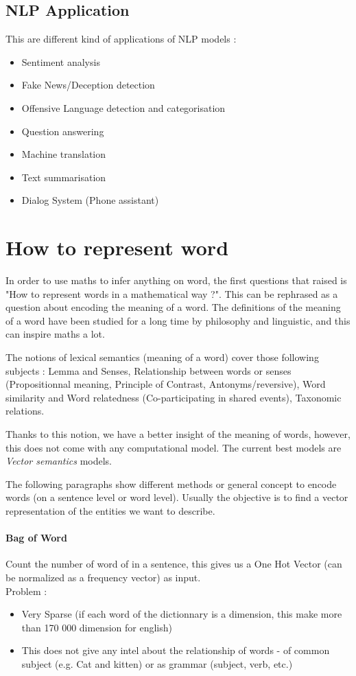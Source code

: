 			\subsection{NLP Application}
				This are different kind of applications of NLP models :
				\begin{itemize}
					\item Sentiment analysis
					\item Fake News/Deception detection
					\item Offensive Language detection and categorisation
					\item Question answering
					\item Machine translation
					\item Text summarisation
					\item Dialog System (Phone assistant)
				\end{itemize}

	\section{How to represent word}

		In order to use maths to infer anything on word, the first questions that raised is "How to represent words in a mathematical way ?". This can be rephrased as a question about encoding the meaning of a word. The definitions of the meaning of a word have been studied for a long time by philosophy and linguistic, and this can inspire maths a lot. 

		The notions of lexical semantics (meaning of a word) cover those following subjects :  Lemma and Senses, Relationship between words or senses (Propositionnal meaning, Principle of Contrast, Antonyms/reversive), Word similarity and Word relatedness (Co-participating in shared events), Taxonomic relations.

		Thanks to this notion, we have a better insight of the meaning of words, however, this does not come with any computational model. The current best models are \emph{Vector semantics} models.

		The following paragraphs show different methods or general concept to encode words (on a sentence level or word level). Usually the objective is to find a vector representation of the entities we want to describe.

		\paragraph{Bag of Word}
			Count the number of word of in a sentence, this gives us a One Hot Vector (can be normalized as a frequency vector) as input.\\
			Problem : 
			\begin{itemize}
				\item Very Sparse (if each word of the dictionnary is a dimension, this make more than 170 000 dimension for english)
				\item This does not give any intel about the relationship of words - of common subject (e.g. Cat and kitten) or as grammar (subject, verb, etc.)
			\end{itemize}

